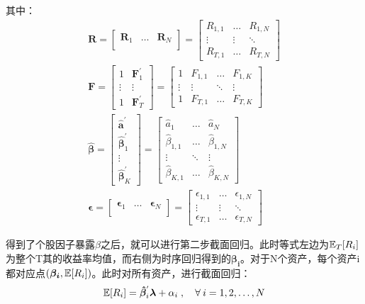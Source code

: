 \documentclass[11pt]{article}
\begin{document}
其中：
\begin{gather*}
    \bm{R} = \begin{bmatrix} \bm{R}_1 & \dots & \bm{R}_N \\ \end{bmatrix}
    = \begin{bmatrix} R_{1,1} & \dots & R_{1,N} \\ \vdots & \vdots & \ddots \\ R_{T,1} & \dots & R_{T,N} \end{bmatrix} \\
    \bm{F} = \begin{bmatrix} 1 & \bm{F}_{1}^{'} \\ \vdots & \vdots \\ 1 & \bm{F}_{T}^{'} \end{bmatrix}
    = \begin{bmatrix} 1 & F_{1,1} & \dots & F_{1,K} \\ \vdots & \vdots & \ddots & \vdots \\ 1 & F_{T,1} & \dots & F_{T,K} \end{bmatrix} 
    \\
    \hat{\bm{\beta}}
    = \begin{bmatrix} \bm{\hat{a}}^{'} \\ \bm{\hat{\beta}}_{1}^{'} \\ \vdots \\ \bm{\hat{\beta}}_{K}^{'} \end{bmatrix}
    = \begin{bmatrix} \hat{a}_{1} & \dots & \hat{a}_{N} \\ \hat{\beta}_{1,1} & \dots & \hat{\beta}_{1,N} \\ \vdots & \ddots & \vdots \\ \hat{\beta}_{K,1} & \dots & \hat{\beta}_{K,N} \end{bmatrix}
    \\
    \bm{\epsilon} = \begin{bmatrix}
        \bm{\epsilon}_1 & \dots & \bm{\epsilon}_N \\
    \end{bmatrix}
    = \begin{bmatrix} \epsilon_{1,1} & \dots & \epsilon_{1,N} \\ \vdots & \vdots & \ddots \\ \epsilon_{T,1} & \dots & \epsilon_{T,N} \end{bmatrix}
\end{gather*}

得到了个股因子暴露$\beta$之后，就可以进行第二步截面回归。此时等式左边为$\mathbb{E}_T[R_i]$为整个T其的收益率均值，而右侧为时序回归得到的$\bm{\beta_i}$。对于N个资产，每个资产i都对应点$(\bm{\beta_i},\mathbb{E}[R_i])$。此时对所有资产，进行截面回归：
\begin{equation*}
    \E[R_i] = \bm{\hat{\beta}}_{i}^{'} \bm{\lambda} + \alpha_i \inlinesep \forall i=1,2,\dots,N
\end{equation*}
\end{document}
